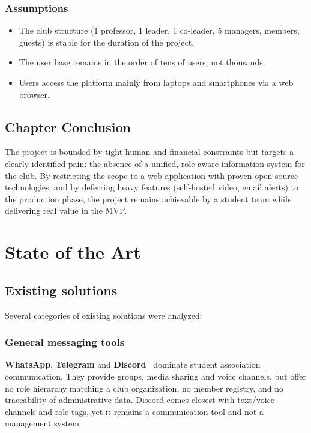 \documentclass[12pt,a4paper]{report}
\begin{document}
\subsection{Assumptions}

\begin{itemize}[leftmargin=*]
    \item The club structure (1 professor, 1 leader, 1 co-leader, 5 managers, members,
          guests) is stable for the duration of the project.
    \item The user base remains in the order of tens of users, not thousands.
    \item Users access the platform mainly from laptops and smartphones via a web
          browser.
\end{itemize}

\section{Chapter Conclusion}

The project is bounded by tight human and financial constraints but targets a clearly
identified pain: the absence of a unified, role-aware information system for the club.
By restricting the scope to a web application with proven open-source technologies, and
by deferring heavy features (self-hosted video, email alerts) to the production phase,
the project remains achievable by a student team while delivering real value in the MVP.

\clearpage

\chapter{State of the Art}

\section{Existing solutions}

Several categories of existing solutions were analyzed:

\subsection{General messaging tools}
\textbf{WhatsApp}, \textbf{Telegram} and \textbf{Discord}~\cite{discord} dominate student
association communication. They provide groups, media sharing and voice channels, but
offer no role hierarchy matching a club organization, no member registry, and no
traceability of administrative data. Discord comes closest with text/voice channels and
role tags, yet it remains a communication tool and not a management system.
\end{document}
